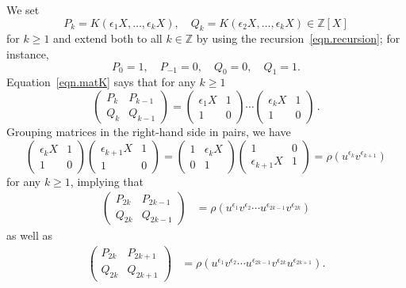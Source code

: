 \documentclass{amsart}
\newcommand{\Z}{\mathbb{Z}}
\theoremstyle{definition}
\begin{document}
We set 
\begin{equation}
    \label{eqn.PQ}
    P_k=K(\epsilon_1 X,\ldots,\epsilon_{k}X), \quad Q_k=K(\epsilon_2X,\ldots,\epsilon_k X)\in \Z[X] 
\end{equation}
for $k\ge 1$ and extend both to all $k\in \Z$ by using the recursion~\eqref{eqn.recursion}; for instance, 
$$ P_0=1,\quad P_{-1}=0,\quad Q_0=0,\quad Q_1=1.$$
Equation~\eqref{eqn.matK} says that for any $k\ge 1$
\begin{equation}
\label{eqn.sym}
    \begin{pmatrix} P_k & P_{k-1}\\ Q_k & Q_{k-1}\end{pmatrix}=\begin{pmatrix} \epsilon_1 X & 1 \\ 1 & 0 \end{pmatrix} \cdots \begin{pmatrix} \epsilon_k X & 1 \\ 1 & 0 \end{pmatrix}\,.
\end{equation}
Grouping matrices in the right-hand side in pairs, we have 
\begin{equation*}
    \begin{pmatrix} \epsilon_k X & 1 \\ 1 & 0 \end{pmatrix} \begin{pmatrix} \epsilon_{k+1} X & 1 \\ 1 & 0 \end{pmatrix}=
    \begin{pmatrix} 1 & \epsilon_k X  \\ 0 & 1\end{pmatrix} \begin{pmatrix} 1 & 0 \\ \epsilon_{k+1} X & 1 \end{pmatrix}=\rho(u^{\epsilon_k}v^{\epsilon_{k+1}})
\end{equation*}
for any $k \geq 1$, implying that
\begin{align}
\label{eqn.PQmatrix}
    \begin{pmatrix} P_{2k} & P_{2k-1}\\ Q_{2k} & Q_{2k-1}\end{pmatrix}&=\rho(u^{\epsilon_1}v^{\epsilon_2}\cdots u^{\epsilon_{2k-1}}v^{\epsilon_{2k}})
\end{align}
as well as 
\begin{align}
\label{eqn.PQmatrix2}
    \begin{pmatrix} P_{2k} & P_{2k+1}\\ Q_{2k} & Q_{2k+1}\end{pmatrix}&=\rho(u^{\epsilon_1}v^{\epsilon_2}\cdots u^{\epsilon_{2k-1}} v^{\epsilon_{2k}}u^{\epsilon_{2k+1}}).
\end{align}
\end{document}
